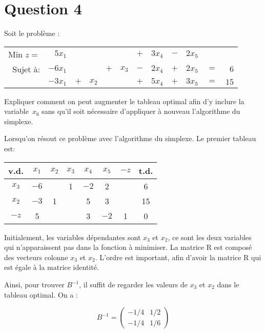 \section*{Question 4}
\begin{em}
Soit le problème :

\begin{tabular}{@{}rrrrrrrrrrrr@{}}
	Min $z =$ &  $5x_1$ &     &       &     &       & $+$ & $3x_4$ & $-$ & $2x_5$ &     &    \\
	 Sujet à: & $-6x_1$ &     &       & $+$ & $x_3$ & $-$ & $2x_4$ & $+$ & $2x_5$ & $=$ &  $6$ \\
	          & $-3x_1$ & $+$ & $x_2$ &     &       & $+$ & $5x_4$ & $+$ & $3x_5$ & $=$ & $15$
\end{tabular}

Expliquer comment on peut augmenter le tableau optimal afin d’y inclure la variable~$x_6$ sans qu’il soit nécessaire d’appliquer à nouveau l’algorithme du simplexe.
\end{em}

Lorsqu’on résout ce problème avec l’algorithme du simplexe. Le premier tableau est:

\begin{center}
	\renewcommand{\arraystretch}{1.5}
	\begin{tabular}{|c|cccccc|c|}
		\hline
		 v.d.   & $x_{1}$ & $x_{2}$ & $x_{3}$ & $x_{4}$ & $x_{5}$ & $-z$ & t.d. \\ \hline
		$x_{3}$ &  $-6$   &         &    1    &  $-2$   &    2    &      &  6   \\
		$x_{2}$ &  $-3$   &    1    &         &    5    &    3    &      &  15  \\ \hline
		 $-z$   &    5    &         &         &    3    &  $-2$   &  1   &  0   \\ \hline
	\end{tabular}
\end{center}

Initialement, les variables dépendantes sont $x_3$ et $x_2$, ce sont les deux variables qui n’apparaissent pas dans la fonction à minimiser. La matrice R est composé des vecteurs colonne $x_3$ et $x_2$. L’ordre est important, afin d’avoir la matrice R qui est égale à la matrice identité.

Ainsi, pour trouver $B^{-1}$, il suffit de regarder les valeurs de $x_3$ et $x_2$ dans le tableau optimal. On a :

\[
B^{-1} = 
\begin{pmatrix}
	-1/4 & 1/2 \\
	-1/4 & 1/6
\end{pmatrix}
\]

